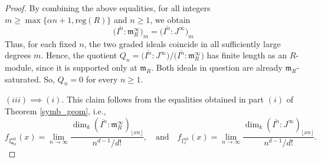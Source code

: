 \documentclass[12pt,a4paper]{amsart}
\theoremstyle{plain}
\theoremstyle{definition}
\numberwithin{equation}{theorem}
\begin{document}
\begin{proof}
By combining the above equalities, for all integers $m\geq \max\{\alpha n+1,\mathrm{reg}(R)\}$ and $n\geq 1$, we obtain
\[
 \big(\overline{I^n} \colon \mathfrak{m}_R^{\infty}\big)_m
  = \big(\overline{I^n} : J^{\infty}\big)_m
\]
Thus, for each fixed $n$, the two graded ideals coincide in all sufficiently large degrees $m$. Hence, the quotient $Q_n = \big(\overline{I^n} : J^{\infty}\big) \big/ \big(\overline{I^n} : \mathfrak{m}_R^{\infty}\big)$ has finite length as an $R$-module, since it is supported only at $\mathfrak{m}_R$. Both ideals in question are already $\mathfrak{m}_R$-saturated. So, $Q_n =0$ for every $n\geq 1$.

$(iii)\implies (i)$. This claim follows from the equalities obtained in part $(i)$ of Theorem \ref{symb_geom}, i.e., $$f_{\mathbb{I}^{\mathrm{sat}}_{\mathfrak{m}_R}}(x) = \lim\limits_{n\to\infty}\frac{\dim_k {(\overline{I^n} : \mathfrak{m}_R^{\infty})}_{\lfloor xn\rfloor}}{n^{d-1}/d!},\quad \text{and}\quad f_{\mathbb{I}^{\mathrm{sat}}_J}(x) = \lim\limits_{n\to\infty}\frac{\dim_k {(\overline{I^n} : J^{\infty})}_{\lfloor xn\rfloor}}{n^{d-1}/d!}.$$
\end{proof}
\end{document}
